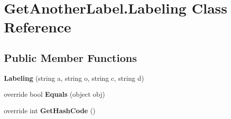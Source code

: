 \hypertarget{class_get_another_label_1_1_labeling}{}\section{Get\+Another\+Label.\+Labeling Class Reference}
\label{class_get_another_label_1_1_labeling}
\subsection*{Public Member Functions}
\begin{DoxyCompactItemize}
\item 
\hypertarget{class_get_another_label_1_1_labeling_ac3ee145752e15f249c0c22d3df452ee5}{}{\bfseries Labeling} (string a, string o, string c, string d)\label{class_get_another_label_1_1_labeling_ac3ee145752e15f249c0c22d3df452ee5}

\item 
\hypertarget{class_get_another_label_1_1_labeling_ab720bfcf76bdd4e0e9cb6058897a9d3e}{}override bool {\bfseries Equals} (object obj)\label{class_get_another_label_1_1_labeling_ab720bfcf76bdd4e0e9cb6058897a9d3e}

\item 
\hypertarget{class_get_another_label_1_1_labeling_a1b7edd199c225d5fe161f8d9edd60e7c}{}override int {\bfseries Get\+Hash\+Code} ()\label{class_get_another_label_1_1_labeling_a1b7edd199c225d5fe161f8d9edd60e7c}

\end{DoxyCompactItemize}
